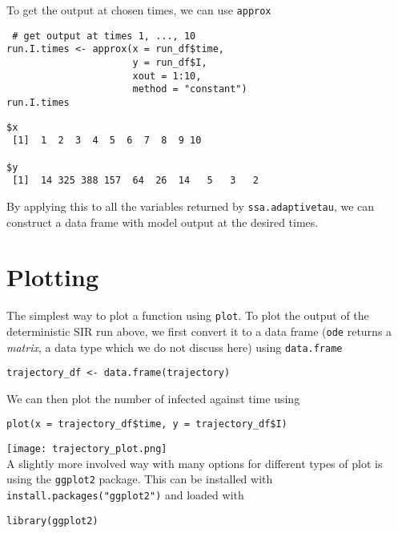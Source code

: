 \documentclass[11pt,a4paper]{article}
\begin{document}
To get the output at chosen times, we can use \texttt{approx} \\

\begin{verbatim}
 # get output at times 1, ..., 10
run.I.times <- approx(x = run_df$time,
                      y = run_df$I,
                      xout = 1:10,
                      method = "constant")
run.I.times
\end{verbatim}

\begin{verbatim}
$x
 [1]  1  2  3  4  5  6  7  8  9 10

$y
 [1]  14 325 388 157  64  26  14   5   3   2
\end{verbatim}

By applying this to all the variables returned by \texttt{ssa.adaptivetau}, we can construct a data frame with model output at the desired times. \\

\section{Plotting}
\label{sec-7}
The simplest way to plot a function using \texttt{plot}. To plot the output of the deterministic SIR run above, we first convert it to a data frame (\texttt{ode} returns a \emph{matrix}, a data type which we do not discuss here) using \texttt{data.frame} \\

\begin{verbatim}
trajectory_df <- data.frame(trajectory)
\end{verbatim}

We can then plot the number of infected against time using \\

\begin{verbatim}
plot(x = trajectory_df$time, y = trajectory_df$I)
\end{verbatim}

\texttt{[image: trajectory\_plot.png]} \\

A slightly more involved way with many options for different types of plot is using the \texttt{ggplot2} package. This can be installed with \texttt{install.packages("ggplot2")} and loaded with \\

\begin{verbatim}
library(ggplot2)
\end{verbatim}
\end{document}
